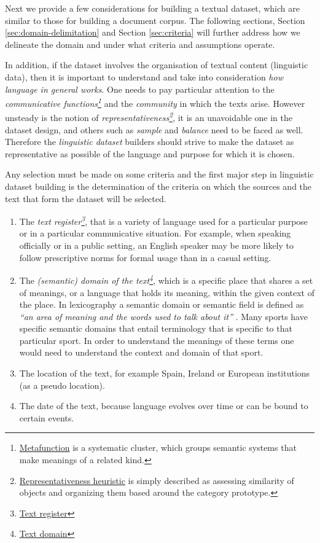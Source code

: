 Next we provide a few considerations for building a textual dataset, which are similar to those for building a document corpus. The following sections, Section \ref{sec:domain-delimitation} and Section \ref{sec:criteria} will further address how we delineate the domain and under what criteria and assumptions operate.

In addition, if the dataset involves the organisation of textual content (linguistic data), then it is important to understand and take into consideration \textit{how language in general works}. One needs to pay particular attention to the \textit{communicative functions\footnote{ \href{https://en.wikipedia.org/wiki/Metafunction}{Metafunction} is a systematic cluster, which groups semantic systems that make meanings of a related kind.  }} and the \textit{community} in which the texts arise. However unsteady is the notion of \textit{representativeness\footnote{ \href{https://en.wikipedia.org/wiki/Representativeness_heuristic}{Representativeness heuristic} is simply described as assessing similarity of objects and organizing them based around the category prototype.  }}, it is an unavoidable one in the dataset design, and others such as \textit{sample} and \textit{balance} need to be faced as well. Therefore the \textit{linguistic dataset} builders should strive to make the dataset as representative as possible of the language and purpose for which it is chosen. 

Any selection must be made on some criteria and the first major step in linguistic dataset building is the determination of the criteria on which the sources and the text that form the dataset will be selected.

\begin{enumerate}
	\item The \textit{text register\footnote{ \href{https://en.wikipedia.org/wiki/Register_(sociolinguistics)}{Text register} }}, that is a variety of language used for a particular purpose or in a particular communicative situation. For example, when speaking officially or in a public setting, an English speaker may be more likely to follow prescriptive norms for formal usage than in a casual setting. 
	\item The \textit{(semantic) domain of the text\footnote{ \href{https://en.wikipedia.org/wiki/Semantic_domain}{Text domain} }}, which is a specific place that shares a set of meanings, or a language that holds its meaning, within the given context of the place. In lexicography a semantic domain or semantic field is defined as \textit{``an area of meaning and the words used to talk about it'' }. Many sports have specific semantic domains that entail terminology that is specific to that particular sport. In order to understand the meanings of these terms one would need to understand the context and domain of that sport.
	\item The location of the text, for example Spain, Ireland or European institutions (as a pseudo location).
	\item The date of the text, because language evolves over time or can be bound to certain events. 
\end{enumerate}

